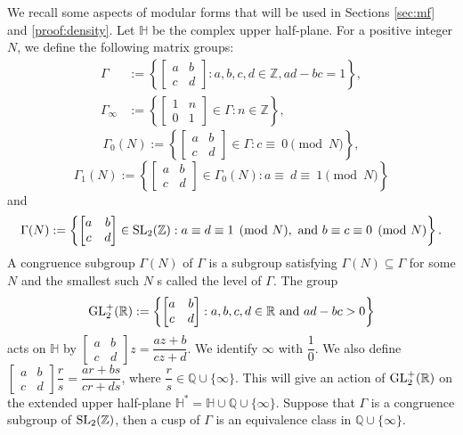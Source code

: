 \documentclass[12pt,reqno]{amsart}
\numberwithin{equation}{section}
\begin{document}
We recall some aspects of modular forms that will be used in Sections \ref{sec:mf} and \ref{proof:density}. Let $\mathbb{H}$ be the complex upper half-plane. For a positive integer $N$, we define the following matrix groups:
\begin{align*}
\Gamma & :=\left\{\begin{bmatrix}
a  &  b \\
c  &  d      
\end{bmatrix}: a, b, c, d \in \mathbb{Z}, ad-bc=1
\right\},\\
\Gamma_{\infty} & :=\left\{
\begin{bmatrix}
1  &  n \\
0  &  1      
\end{bmatrix} \in \Gamma : n\in \mathbb{Z}  \right\},
\end{align*}
$$\Gamma_{0}(N) :=\left\{
\begin{bmatrix}
a  &  b \\
c  &  d      
\end{bmatrix} \in \Gamma : c\equiv~0\pmod N \right\},$$
$$\Gamma_{1}(N) :=\left\{
\begin{bmatrix}
a  &  b \\
c  &  d      
\end{bmatrix} \in \Gamma_0(N) : a\equiv~d\equiv~1\pmod N \right\}$$
and
$$
\Gamma(N) :=\left\{
	\begin{bmatrix}
		a  &  b \\
		c  &  d      
	\end{bmatrix} \in \textup{SL}_2(\mathbb{Z}) : a\equiv d\equiv 1\pmod N,~ \textup{and}~b\equiv c\equiv 0\pmod N\right\}.
	$$
        A congruence subgroup $\Gamma(N)$ of $\Gamma$ is a subgroup satisfying $\Gamma(N)\subseteq\Gamma$ for some $N$ and the smallest such $N$ s called the level of $\Gamma$. The group
		$$\textup{GL}^{+}_{2}(\mathbb{R}) :=\left\{
	\begin{bmatrix}
		a  &  b \\
		c  &  d      
	\end{bmatrix} : a, b, c, d \in \mathbb{R}~\textup{and}~ad-bc>0\right\}$$
	acts on $\mathbb{H}$ by $\begin{bmatrix}
		a  &  b \\
		c  &  d      
	\end{bmatrix}z = \dfrac{az+b}{cz+d}$. We identify $\infty$ with $\dfrac{1}{0}$. We also define $\begin{bmatrix}
	a  &  b \\
	c  &  d
	\end{bmatrix}\dfrac{r}{s} = \dfrac{ar+bs}{cr+ds}$, where $\dfrac{r}{s}\in\mathbb{Q}\cup\{\infty\}$. This will give an action of $\textup{GL}^{+}_{2}(\mathbb{R})$ on the extended upper half-plane $\mathbb{H^{*}}=\mathbb{H}\cup\mathbb{Q}\cup\{\infty\}$. Suppose that $\Gamma$ is a congruence subgroup of $\textup{SL}_2(\mathbb{Z})$, then a cusp of $\Gamma$ is an equivalence class in $\mathbb{Q}\cup\{\infty\}$.
\end{document}
